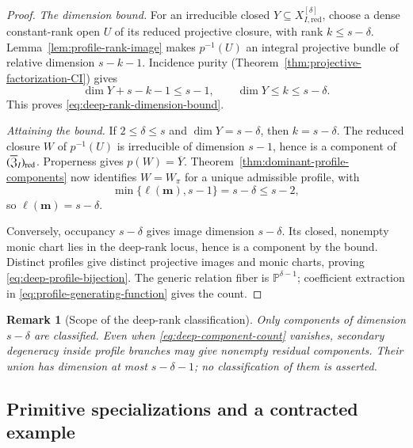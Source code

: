 \documentclass[10pt,fleqn]{article}
\numberwithin{equation}{section}
\newtheorem{remark}[theorem]{Remark}
\newcommand{\PP}{\mathbb P}
\begin{document}
\begin{proof}
\emph{The dimension bound.}
For an irreducible closed $Y\subseteq X_{I,\mathrm{red}}^{[\delta]}$,
choose a dense constant-rank open $U$ of its reduced projective closure,
with rank $k\le s-\delta$.  Lemma~\ref{lem:profile-rank-image} makes
$p^{-1}(U)$ an integral projective bundle of relative dimension $s-k-1$.
Incidence purity (Theorem~\ref{thm:projective-factorization-CI}) gives
\begin{equation*}
 \dim Y+s-k-1\le s-1,\qquad \dim Y\le k\le s-\delta.
\end{equation*}
This proves \eqref{eq:deep-rank-dimension-bound}.

\emph{Attaining the bound.}
If $2\le\delta\le s$ and $\dim Y=s-\delta$, then $k=s-\delta$.
The reduced closure $W$ of $p^{-1}(U)$ is irreducible of dimension $s-1$,
hence is a component of $(\overline{\mathfrak Z}_I)_{\rm red}$.
Properness gives $p(W)=\overline Y$.
Theorem~\ref{thm:dominant-profile-components} now identifies $W=W_\pi$
for a unique admissible profile, with
\begin{equation*}
 \min\{\ell(\boldsymbol m),s-1\}=s-\delta\le s-2,
\end{equation*}
so $\ell(\boldsymbol m)=s-\delta$.

Conversely, occupancy $s-\delta$ gives image dimension $s-\delta$.
Its closed, nonempty monic chart lies in the deep-rank locus, hence is
a component by the bound.  Distinct profiles give distinct projective
images and monic charts, proving \eqref{eq:deep-profile-bijection}.
The generic relation fiber is $\PP^{\delta-1}$; coefficient extraction
in \eqref{eq:profile-generating-function} gives the count.
\end{proof}

\begin{remark}[Scope of the deep-rank classification]
\label{rem:bound-attaining-essential}
Only components of dimension $s-\delta$ are classified.
Even when \eqref{eq:deep-component-count} vanishes, secondary degeneracy
inside profile branches may give nonempty residual components.
Their union has dimension at most $s-\delta-1$; no classification
of them is asserted.
\end{remark}

\subsection{Primitive specializations and a contracted example}
\label{r26:formal:specializations}
\end{document}
